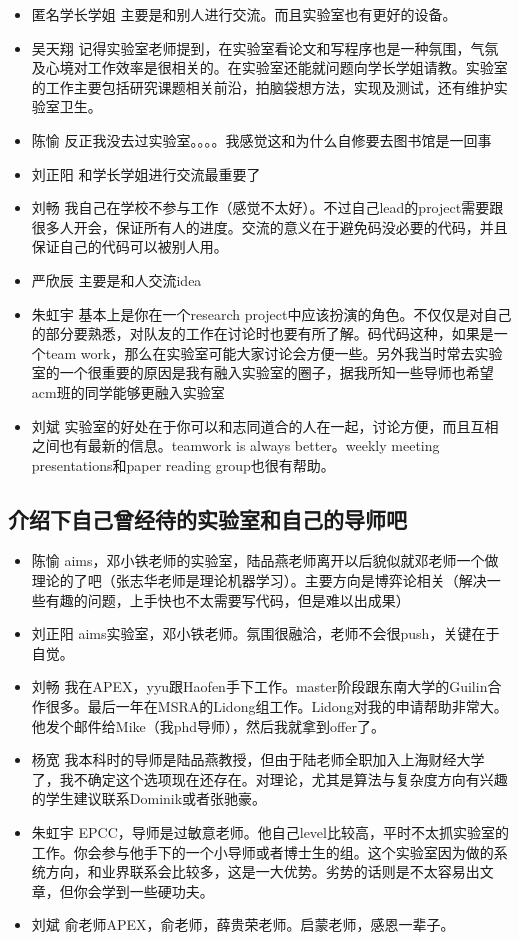 \documentclass{vivid_layout}
\begin{document}
\begin{itemize}
\item {\name 匿名学长学姐}  \quad 主要是和别人进行交流。而且实验室也有更好的设备。
\item { 吴天翔} \quad 记得实验室老师提到，在实验室看论文和写程序也是一种氛围，气氛及心境对工作效率是很相关的。在实验室还能就问题向学长学姐请教。实验室的工作主要包括研究课题相关前沿，拍脑袋想方法，实现及测试，还有维护实验室卫生。
\item  { 陈愉}  \quad 反正我没去过实验室。。。。我感觉这和为什么自修要去图书馆是一回事
\item  { 刘正阳}  \quad 和学长学姐进行交流最重要了
\item  { 刘畅}  \quad 我自己在学校不参与工作（感觉不太好）。不过自己lead的project需要跟很多人开会，保证所有人的进度。交流的意义在于避免码没必要的代码，并且保证自己的代码可以被别人用。
\item  { 严欣辰}  \quad 主要是和人交流idea
\item  { 朱虹宇}  \quad 基本上是你在一个research project中应该扮演的角色。不仅仅是对自己的部分要熟悉，对队友的工作在讨论时也要有所了解。码代码这种，如果是一个team work，那么在实验室可能大家讨论会方便一些。另外我当时常去实验室的一个很重要的原因是我有融入实验室的圈子，据我所知一些导师也希望acm班的同学能够更融入实验室
\item  { 刘斌}  \quad 实验室的好处在于你可以和志同道合的人在一起，讨论方便，而且互相之间也有最新的信息。teamwork is always better。weekly meeting presentations和paper reading group也很有帮助。
\end{itemize}

\subsection{介绍下自己曾经待的实验室和自己的导师吧}
\begin{itemize}
\item  { 陈愉}  \quad  aims，邓小铁老师的实验室，陆品燕老师离开以后貌似就邓老师一个做理论的了吧（张志华老师是理论机器学习）。主要方向是博弈论相关（解决一些有趣的问题，上手快也不太需要写代码，但是难以出成果）
\item  { 刘正阳}  \quad aims实验室，邓小铁老师。氛围很融洽，老师不会很push，关键在于自觉。
\item  { 刘畅}  \quad 我在APEX，yyu跟Haofen手下工作。master阶段跟东南大学的Guilin合作很多。最后一年在MSRA的Lidong组工作。Lidong对我的申请帮助非常大。他发个邮件给Mike（我phd导师），然后我就拿到offer了。
\item  { 杨宽}  \quad 我本科时的导师是陆品燕教授，但由于陆老师全职加入上海财经大学了，我不确定这个选项现在还存在。对理论，尤其是算法与复杂度方向有兴趣的学生建议联系Dominik或者张驰豪。
\item  { 朱虹宇}  \quad EPCC，导师是过敏意老师。他自己level比较高，平时不太抓实验室的工作。你会参与他手下的一个小导师或者博士生的组。这个实验室因为做的系统方向，和业界联系会比较多，这是一大优势。劣势的话则是不太容易出文章，但你会学到一些硬功夫。
\item  { 刘斌}  \quad 俞老师APEX，俞老师，薛贵荣老师。启蒙老师，感恩一辈子。
\end{itemize}
\end{document}
